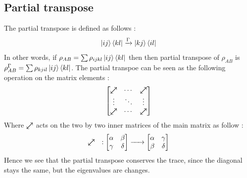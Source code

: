 \documentclass{article}
\newcommand{\neswarrow}{\mathrel{\text{$\nearrow$\llap{$\swarrow$}}}}
\begin{document}
\subsection{Partial transpose}
The partial transpose is defined as follows :
\begin{equation}
    \ket{ij}\bra{kl} \xrightarrow{\Gamma} \ket{kj}\bra{il}
\end{equation}
In other words, if $\rho_{AB} = \sum \rho_{ijkl}\ket{ij}\bra{kl}$
then then partial transpose of $\rho_{AB}$ is
$\rho_{AB}^\Gamma = \sum \rho_{kjil}\ket{ij}\bra{kl}$.
The partial transpoe can be seen as the following operation
on the matrix elements :
\begin{equation}
    \begin{bmatrix}
        \neswarrow & \cdots & \neswarrow \\
        \vdots & \ddots & \vdots \\
        \neswarrow & \cdots & \neswarrow \\
    \end{bmatrix}
\end{equation}
Where $\neswarrow$ acts on the two by two inner matrices of the main matrix as
follow :
\begin{equation}
    \neswarrow \quad :
    \begin{bmatrix}
        \alpha & \beta \\ \gamma & \delta
    \end{bmatrix}
    \xrightarrow{\hspace*{0.5cm}}
    \begin{bmatrix}
        \alpha & \gamma \\ \beta & \delta
    \end{bmatrix}
\end{equation}
Hence we see that the partial transpose conserves the trace, since the diagonal
stays the same, but the eigenvalues are changes.
\end{document}
